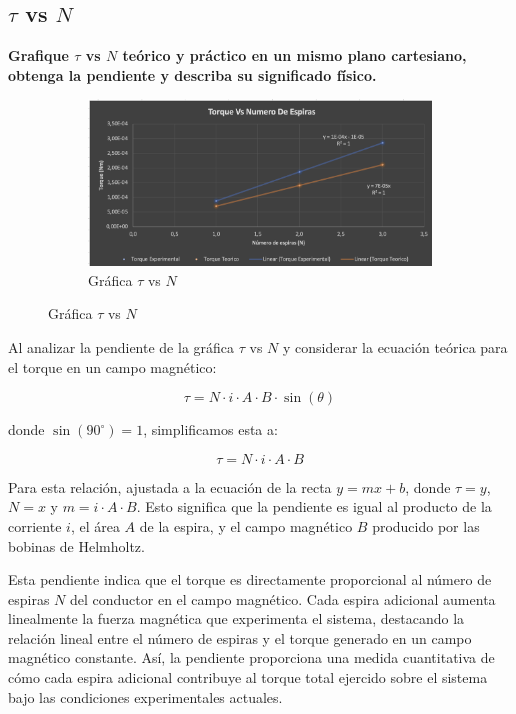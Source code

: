 \subsection{$\tau$ vs $N$}
\textbf{Grafique $\tau$ vs $N$ teórico y práctico en un mismo plano cartesiano, obtenga la
pendiente y describa su significado físico.}

\begin{figure}[H]
  \centering
  \begin{subfigure}[b]{\textwidth}
      \centering
      \includegraphics[width=\textwidth]{Figures/1. Content/grafica3.png}
      \caption{Gráfica $\tau$ vs $N$}
      \label{fig: Grafica 3}
  \end{subfigure}
  \hfill
\end{figure}

Al analizar la pendiente de la gráfica $\tau$ vs $N$ y considerar la ecuación teórica para el torque en un campo magnético:

\[
\tau = N \cdot i \cdot A \cdot B \cdot \sin(\theta)
\]

donde $\sin(90^\circ) = 1$, simplificamos esta a:

\[
\tau = N \cdot i \cdot A \cdot B
\]

Para esta relación, ajustada a la ecuación de la recta \(y = mx + b\), donde \(\tau = y\), \(N = x\) y \(m = i \cdot A \cdot B\). Esto significa que la pendiente es igual al producto de la corriente \(i\), el área \(A\) de la espira, y el campo magnético \(B\) producido por las bobinas de Helmholtz.

Esta pendiente indica que el torque es directamente proporcional al número de espiras \(N\) del conductor en el campo magnético. Cada espira adicional aumenta linealmente la fuerza magnética que experimenta el sistema, destacando la relación lineal entre el número de espiras y el torque generado en un campo magnético constante. Así, la pendiente proporciona una medida cuantitativa de cómo cada espira adicional contribuye al torque total ejercido sobre el sistema bajo las condiciones experimentales actuales.


